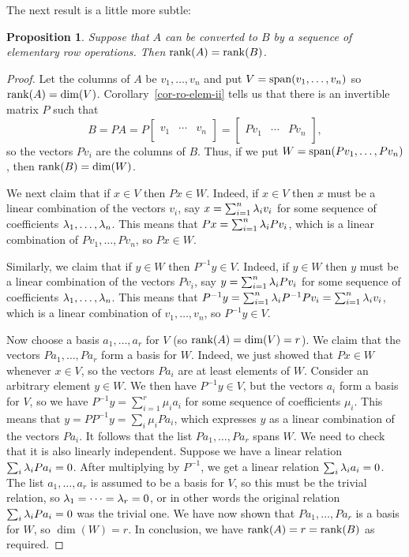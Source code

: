 \documentclass[reqno]{amsart}
\newtheorem{proposition}[theorem]{Proposition}
\theoremstyle{definition}
\begin{document}
The next result is a little more subtle:
\begin{proposition}\label{prop-ro-rank}
 Suppose that $A$ can be converted to $B$ by a sequence of elementary
 \emph{row} operations.  Then $\operatorname{rank}(A)=\operatorname{rank}(B)$.
\end{proposition}
\begin{proof}
 Let the columns of $A$ be $v_1,\dotsc,v_n$ and put
 $V=\operatorname{span}(v_1,\dotsc,v_n)$ so $\operatorname{rank}(A)=\dim(V)$.
 Corollary~\ref{cor-ro-elem-ii} tells us that there is an invertible
 matrix $P$ such that 
 \[ B=PA= P
    \left[\begin{array}{c|c|c}
     && \\ v_1 & \cdots & v_n \\ &&
    \end{array}\right]
    = 
    \left[\begin{array}{c|c|c}
     && \\ Pv_1 & \cdots & Pv_n \\ &&
    \end{array}\right],
 \]
 so the vectors $Pv_i$ are the columns of $B$.  Thus, if we put
 $W=\operatorname{span}(Pv_1,\dotsc,Pv_n)$, then $\operatorname{rank}(B)=\dim(W)$.

 We next claim that if $x\in V$ then $Px\in W$.  Indeed, if $x\in V$
 then $x$ must be a linear combination of the vectors $v_i$, say
 $x=\sum_{i=1}^n\lambda_iv_i$ for some sequence of coefficients
 $\lambda_1,\dotsc,\lambda_n$.  This means that $Px=\sum_{i=1}^n\lambda_iPv_i$,
 which is a linear combination of $Pv_1,\dotsc,Pv_n$, so $Px\in W$.

 Similarly, we claim that if $y\in W$ then $P^{-1}y\in V$.  Indeed, if
 $y\in W$ then $y$ must be a linear combination of the vectors $Pv_i$,
 say $y=\sum_{i=1}^n\lambda_iPv_i$ for some sequence of coefficients
 $\lambda_1,\dotsc,\lambda_n$.  This means that
 $P^{-1}y=\sum_{i=1}^n\lambda_iP^{-1}Pv_i=\sum_{i=1}^n\lambda_iv_i$,
 which is a linear combination of $v_1,\dotsc,v_n$, so $P^{-1}y\in V$.

 Now choose a basis $a_1,\dotsc,a_r$ for $V$ (so
 $\operatorname{rank}(A)=\dim(V)=r$).  We claim that the vectors $Pa_1,\dotsc,Pa_r$
 form a basis for $W$.  Indeed, we just showed that $Px\in W$ whenever
 $x\in V$, so the vectors $Pa_i$ are at least elements of $W$.
 Consider an arbitrary element $y\in W$.  We then have $P^{-1}y\in V$,
 but the vectors $a_i$ form a basis for $V$, so we have
 $P^{-1}y=\sum_{i=1}^r\mu_ia_i$ for some sequence of coefficients
 $\mu_i$.  This means that $y=PP^{-1}y=\sum_i\mu_iPa_i$, which
 expresses $y$ as a linear combination of the vectors $Pa_i$.  It
 follows that the list $Pa_1,\dotsc,Pa_r$ spans $W$.  We need to check
 that it is also linearly independent.  Suppose we have a linear
 relation $\sum_i\lambda_iPa_i=0$.  After multiplying by $P^{-1}$, we get
 a linear relation $\sum_i\lambda_ia_i=0$.  The list $a_1,\dotsc,a_r$ is
 assumed to be a basis for $V$, so this must be the trivial relation,
 so $\lambda_1=\dotsb=\lambda_r=0$, or in other words the original relation 
 $\sum_i\lambda_iPa_i=0$ was the trivial one.  We have now shown that
 $Pa_1,\dotsc,Pa_r$ is a basis for $W$, so $\dim(W)=r$.  In
 conclusion, we have $\operatorname{rank}(A)=r=\operatorname{rank}(B)$ as required.
\end{proof}
\end{document}
